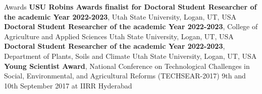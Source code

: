 \begin{rubric}{Awards}
\entrya[] \textbf{USU Robins Awards finalist for Doctoral Student Researcher of the academic Year 2022-{}2023}, Utah State University, Logan, UT, USA
\entrya[] \textbf{Doctoral Student Researcher of the academic Year 2022-{}2023}, College of Agriculture and Applied Sciences Utah State University, Logan, UT, USA
\entrya[] \textbf{Doctoral Student Researcher of the academic Year 2022-{}2023}, Department of Plants, Soils and Climate Utah State University, Logan, UT, USA
\entrya[] \textbf{Young Scientist Award}, National Conference on Technological Challenges in Social, Environmental, and Agricultural Reforms (TECHSEAR-2017) 9th and 10th September 2017 at IIRR Hyderabad
\end{rubric}